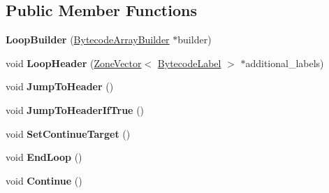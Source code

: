 \subsection*{Public Member Functions}
\begin{DoxyCompactItemize}
\item 
{\bfseries Loop\+Builder} (\hyperlink{classv8_1_1internal_1_1interpreter_1_1_bytecode_array_builder}{Bytecode\+Array\+Builder} $\ast$builder)\hypertarget{classv8_1_1internal_1_1interpreter_1_1_loop_builder_a334400c1d428cb46bc40326ce390c677}{}\label{classv8_1_1internal_1_1interpreter_1_1_loop_builder_a334400c1d428cb46bc40326ce390c677}

\item 
void {\bfseries Loop\+Header} (\hyperlink{classv8_1_1internal_1_1_zone_vector}{Zone\+Vector}$<$ \hyperlink{classv8_1_1internal_1_1interpreter_1_1_bytecode_label}{Bytecode\+Label} $>$ $\ast$additional\+\_\+labels)\hypertarget{classv8_1_1internal_1_1interpreter_1_1_loop_builder_a74bab7195a60339a43596d5d98cc99c2}{}\label{classv8_1_1internal_1_1interpreter_1_1_loop_builder_a74bab7195a60339a43596d5d98cc99c2}

\item 
void {\bfseries Jump\+To\+Header} ()\hypertarget{classv8_1_1internal_1_1interpreter_1_1_loop_builder_ab0e143965872abbe786f7114cfcd166c}{}\label{classv8_1_1internal_1_1interpreter_1_1_loop_builder_ab0e143965872abbe786f7114cfcd166c}

\item 
void {\bfseries Jump\+To\+Header\+If\+True} ()\hypertarget{classv8_1_1internal_1_1interpreter_1_1_loop_builder_acd759d327b9ad51a07e285be9f7c2664}{}\label{classv8_1_1internal_1_1interpreter_1_1_loop_builder_acd759d327b9ad51a07e285be9f7c2664}

\item 
void {\bfseries Set\+Continue\+Target} ()\hypertarget{classv8_1_1internal_1_1interpreter_1_1_loop_builder_ae4e936a7683327e88200c3f1dcadb556}{}\label{classv8_1_1internal_1_1interpreter_1_1_loop_builder_ae4e936a7683327e88200c3f1dcadb556}

\item 
void {\bfseries End\+Loop} ()\hypertarget{classv8_1_1internal_1_1interpreter_1_1_loop_builder_a7554f4f2078c4513d8eae2b64d13064c}{}\label{classv8_1_1internal_1_1interpreter_1_1_loop_builder_a7554f4f2078c4513d8eae2b64d13064c}

\item 
void {\bfseries Continue} ()\hypertarget{classv8_1_1internal_1_1interpreter_1_1_loop_builder_a1a97f1c6a3a86a29fe33d23daa11e570}{}\label{classv8_1_1internal_1_1interpreter_1_1_loop_builder_a1a97f1c6a3a86a29fe33d23daa11e570}


\end{DoxyCompactItemize}
